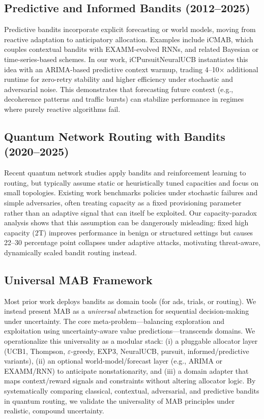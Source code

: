 \documentclass[10pt,twocolumn,journal]{IEEEtran}
\begin{document}
\subsection{Predictive and Informed Bandits (2012--2025)}

Predictive bandits incorporate explicit forecasting or world models, moving from reactive adaptation to anticipatory allocation. Examples include iCMAB, which couples contextual bandits with EXAMM-evolved RNNs, and related Bayesian or time-series-based schemes. In our work, iCPursuitNeuralUCB instantiates this idea with an ARIMA-based predictive context warmup, trading 4--10× additional runtime for zero-retry stability and higher efficiency under stochastic and adversarial noise. This demonstrates that forecasting future context (e.g., decoherence patterns and traffic bursts) can stabilize performance in regimes where purely reactive algorithms fail.

\subsection{Quantum Network Routing with Bandits (2020--2025)}

Recent quantum network studies apply bandits and reinforcement learning to routing, but typically assume static or heuristically tuned capacities and focus on small topologies. Existing work benchmarks policies under stochastic failures and simple adversaries, often treating capacity as a fixed provisioning parameter rather than an adaptive signal that can itself be exploited. Our capacity-paradox analysis shows that this assumption can be dangerously misleading: fixed high capacity (2T) improves performance in benign or structured settings but causes 22--30 percentage point collapses under adaptive attacks, motivating threat-aware, dynamically scaled bandit routing instead.

\subsection{Universal MAB Framework}

Most prior work deploys bandits as domain tools (for ads, trials, or routing). We instead present MAB as a \emph{universal} abstraction for sequential decision-making under uncertainty. The core meta-problem—balancing exploration and exploitation using uncertainty-aware value predictions—transcends domains. We operationalize this universality as a modular stack: (i) a pluggable allocator layer (UCB1, Thompson, $\varepsilon$-greedy, EXP3, NeuralUCB, pursuit, informed/predictive variants), (ii) an optional world-model/forecast layer (e.g., ARIMA or EXAMM/RNN) to anticipate nonstationarity, and (iii) a domain adapter that maps context/reward signals and constraints without altering allocator logic. By systematically comparing classical, contextual, adversarial, and predictive bandits in quantum routing, we validate the universality of MAB principles under realistic, compound uncertainty.
\end{document}
